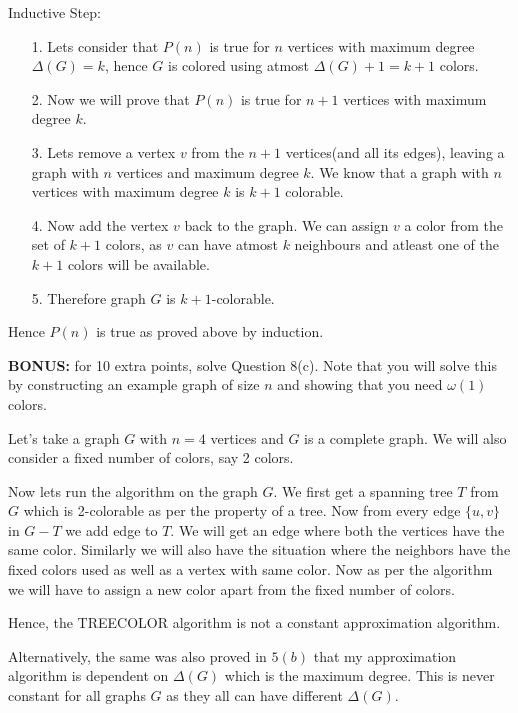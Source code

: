 \documentclass[addpoints]{exam}
\begin{document}
\begin{questions}
\begin{solution}
\begin{parts}
Inductive Step:
\begin{itemize}
\item[1.] Lets consider that $P(n)$ is true for $n$ vertices with maximum degree $\Delta(G) = k$, hence $G$ is colored using atmost $\Delta(G)+1 = k+1$ colors.
\item[2.] Now we will prove that $P(n)$ is true for $n+1$ vertices with maximum degree $k$.
\item[3.] Lets remove a vertex $v$ from the $n+1$ vertices(and all its edges), leaving a graph with $n$ vertices and maximum degree $k$. We know that a graph with $n$ vertices with maximum degree $k$ is $k+1$ colorable.
\item[4.] Now add the vertex $v$ back to the graph. We can assign $v$ a color from the set of $k+1$ colors, as $v$ can have atmost $k$ neighbours and atleast one of the $k+1$ colors will be available.
\item[5.] Therefore graph $G$ is $k+1$-colorable.

\end{itemize}
Hence $P(n)$ is true as proved above by induction.
\end{parts}
\end{solution}

\textbf{BONUS:} for 10 extra points, solve Question 8(c). Note that you will
solve this by constructing an example graph of size $n$ and showing that you
need $\omega(1)$ colors. 
\begin{solution}
Let's take a graph $G$ with $n = 4$ vertices and $G$ is a complete graph. We will also consider a fixed number of colors, say 2 colors. 

Now lets run the algorithm on the graph $G$. We first get a spanning tree $T$ from $G$ which is 2-colorable as per the property of a tree. Now from every edge $\{u,v\}$ in $G-T$ we add edge to $T$. We will get an edge where both the vertices have the same color. Similarly we will also have the situation where the neighbors have the fixed colors used as well as a vertex with same color. Now as per the algorithm we will have to assign a new color apart from the fixed number of colors. 

Hence, the TREECOLOR algorithm is not  a constant approximation algorithm.

Alternatively, the same was also proved in \emph{$5(b)$} that my approximation algorithm is dependent on $\Delta(G)$ which is the maximum degree. This is never constant for all graphs $G$ as they all can have  different $\Delta(G)$.
\end{solution}
\end{questions}
\end{document}
